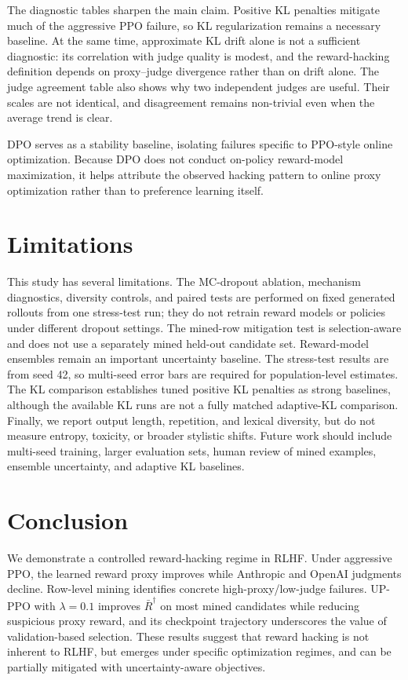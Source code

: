 \documentclass[twocolumn,10pt]{article}
\begin{document}
The diagnostic tables sharpen the main claim. Positive KL penalties mitigate much of the aggressive PPO failure, so KL regularization remains a necessary baseline. At the same time, approximate KL drift alone is not a sufficient diagnostic: its correlation with judge quality is modest, and the reward-hacking definition depends on proxy--judge divergence rather than on drift alone. The judge agreement table also shows why two independent judges are useful. Their scales are not identical, and disagreement remains non-trivial even when the average trend is clear.

DPO serves as a stability baseline, isolating failures specific to PPO-style online optimization. Because DPO does not conduct on-policy reward-model maximization, it helps attribute the observed hacking pattern to online proxy optimization rather than to preference learning itself.



\section{Limitations}
This study has several limitations. The MC-dropout ablation, mechanism diagnostics, diversity controls, and paired tests are performed on fixed generated rollouts from one stress-test run; they do not retrain reward models or policies under different dropout settings. The mined-row mitigation test is selection-aware and does not use a separately mined held-out candidate set. Reward-model ensembles remain an important uncertainty baseline. The stress-test results are from seed 42, so multi-seed error bars are required for population-level estimates. The KL comparison establishes tuned positive KL penalties as strong baselines, although the available KL runs are not a fully matched adaptive-KL comparison. Finally, we report output length, repetition, and lexical diversity, but do not measure entropy, toxicity, or broader stylistic shifts. Future work should include multi-seed training, larger evaluation sets, human review of mined examples, ensemble uncertainty, and adaptive KL baselines.

\section{Conclusion}
We demonstrate a controlled reward-hacking regime in RLHF. Under aggressive PPO, the learned reward proxy improves while Anthropic and OpenAI judgments decline. Row-level mining identifies concrete high-proxy/low-judge failures. UP-PPO with $\lambda=0.1$ improves $\bar R^\dagger$ on most mined candidates while reducing suspicious proxy reward, and its checkpoint trajectory underscores the value of validation-based selection. These results suggest that reward hacking is not inherent to RLHF, but emerges under specific optimization regimes, and can be partially mitigated with uncertainty-aware objectives.
\end{document}
